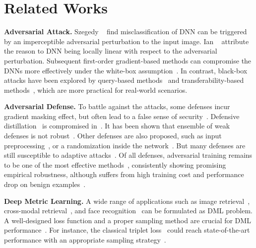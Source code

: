 \documentclass[10pt,twocolumn,letterpaper]{article}
\newcommand{\oo}[1]{\textcolor{orange}{#1}}
\begin{document}
\section{Related Works}
\label{sec:2}

\begin{comment}
\oo{In potential of future works}
Deep metric learning on adversarial example is also used for improving
adversarial robustness for deep classifiers~\cite{mao2019metric}.
\end{comment}

\textbf{Adversarial Attack.}
%
Szegedy \etal~\cite{l-bfgs} find misclassification of DNN can be triggered by
an imperceptible adversarial perturbation to the input image.
%
Ian \etal~\cite{fgsm} attribute the reason to DNN being locally linear with
respect to the adversarial perturbation.
%
Subsequent first-order gradient-based methods can compromise the DNNs more
effectively under the white-box assumption~\cite{i-fgsm,madry,apgd}.
%
In contrast, black-box attacks have been explored by query-based
methods~\cite{nes-atk,spsa-atk} and transferability-based
methods~\cite{di-fgsm}, which are more practical for real-world scenarios.

\textbf{Adversarial Defense.}
%
To battle against the attacks, some defenses incur gradient masking
effect, but often lead to a false sense of security~\cite{obfuscated}.
%
Defensive distillation~\cite{distill2} is compromised in~\cite{cw}.
%
It has been shown that ensemble of weak defenses is not robust~\cite{ensembleweak}.
%
Other defenses are also proposed, such as input
preprocessing~\cite{deflecting}, or a randomization inside the
network~\cite{self-ensemble}.
%
But many defenses are still susceptible to adaptive attacks~\cite{adaptive}.
%
Of all defenses, adversarial training remains to be one of the most effective
methods~\cite{bilateral,advtrain-triplet,benchmarking}, consistently showing
promising empirical robustness, although suffers from high training
cost and performance drop on benign examples~\cite{odds}.

\textbf{Deep Metric Learning.}
%
A wide range of applications such as image retrieval~\cite{imagesim2},
cross-modal retrieval~\cite{ladderloss}, and face recognition~\cite{facenet}
can be formulated as DML problem.
%
A well-designed loss function and a proper sampling method are crucial for DML
performance~\cite{dmlreality}.  For instance, the classical
triplet loss~\cite{facenet} could reach state-of-the-art performance with an appropriate
sampling strategy~\cite{revisiting}.
\end{document}

